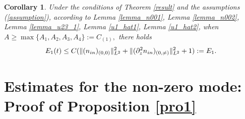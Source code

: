 \documentclass[12pt, reqno]{amsart}
\newtheorem{corollary}{Corollary}[section]
\numberwithin{equation}{section}
\begin{document}
	\begin{corollary}
		Under the conditions of Theorem \ref{result} and the assumptions (\ref{assumption}),
		according to Lemma \ref{lemma_n001}, Lemma \ref{lemma_n002}, Lemma \ref{lemma_u23_1}, Lemma \ref{u1_hat1},  Lemma \ref{u1_hat2}, when $A\geq \max\{A_1,A_2,A_3,A_4\}:=C_{(1)},$
		there holds
		\begin{equation}
			E_1(t)\leq C(\|(n_{\rm in})_{(0,0)}\|^2_{L^2}+\|(\partial_z^2n_{\rm in})_{(0,\neq)}\|_{L^2}^2+1):=E_1.
		\end{equation}
	\end{corollary}
	
	
	\section{Estimates for the non-zero mode: Proof of Proposition \ref{pro1}}\label{sec_pro}
\end{document}
